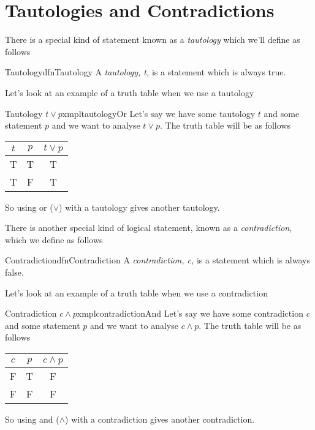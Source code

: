 \section{Tautologies and Contradictions}
There is a special kind of statement known as a \emph{tautology} which we'll define as follows

\begin{dfn}[label={def:tautology}]{Tautology}{dfnTautology}
    A \emph{tautology, t,} is a statement which is always true.
\end{dfn}

Let's look at an example of a truth table when we use a tautology

\begin{exmpl}[label={exmpl:tautologyOr}]{Tautology $t \lor p$}{xmpltautologyOr}
    Let's say we have some tautology $t$ and some statement $p$ and we want to analyse $t \lor p$. The truth table will be as follows
    \begin{center}
        \begin{tabular}{|c|c|c|}
            \hline
            $t$ & $p$ & $t \lor p$ \\
            \hline
            T   & T   & T          \\
            \hline
            T   & F   & T          \\
            \hline
        \end{tabular}
    \end{center}

    So using or ($\lor$) with a tautology gives another tautology.
\end{exmpl}

There is another special kind of logical statement, known as a \emph{contradiction}, which we define as follows

\begin{dfn}[label={def:contradiction}]{Contradiction}{dfnContradiction}
    A \emph{contradiction, c,} is a statement which is always false.
\end{dfn}

Let's look at an example of a truth table when we use a contradiction

\begin{exmpl}[label={exmpl:contradictionAnd}]{Contradiction $c \land p$}{xmplcontradictionAnd}
    Let's say we have some contradiction $c$ and some statement $p$ and we want to analyse $c \land p$. The truth table will be as follows
    \begin{center}
        \begin{tabular}{|c|c|c|}
            \hline
            $c$ & $p$ & $c \land p$ \\
            \hline
            F   & T   & F           \\
            \hline
            F   & F   & F           \\
            \hline
        \end{tabular}
    \end{center}

    So using and ($\land$) with a contradiction gives another contradiction.
\end{exmpl}

